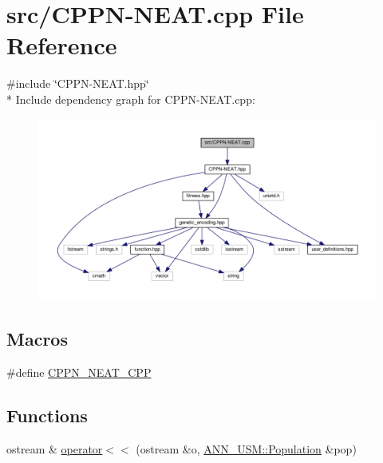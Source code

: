 \hypertarget{_c_p_p_n-_n_e_a_t_8cpp}{\section{src/\-C\-P\-P\-N-\/\-N\-E\-A\-T.cpp File Reference}
\label{_c_p_p_n-_n_e_a_t_8cpp}
}
{\ttfamily \#include \char`\"{}C\-P\-P\-N-\/\-N\-E\-A\-T.\-hpp\char`\"{}}\\*
Include dependency graph for C\-P\-P\-N-\/\-N\-E\-A\-T.cpp\-:
\nopagebreak
\begin{figure}[H]
\begin{center}
\leavevmode
\includegraphics[width=350pt]{_c_p_p_n-_n_e_a_t_8cpp__incl}
\end{center}
\end{figure}
\subsection*{Macros}
\begin{DoxyCompactItemize}
\item 
\#define \hyperlink{_c_p_p_n-_n_e_a_t_8cpp_a9341589bd3db6e2d528925591c40148d}{C\-P\-P\-N\-\_\-\-N\-E\-A\-T\-\_\-\-C\-P\-P}
\end{DoxyCompactItemize}
\subsection*{Functions}
\begin{DoxyCompactItemize}
\item 
ostream \& \hyperlink{_c_p_p_n-_n_e_a_t_8cpp_a81655a8d2a9e6437481493618f945ea4}{operator$<$$<$} (ostream \&o, \hyperlink{class_a_n_n___u_s_m_1_1_population}{A\-N\-N\-\_\-\-U\-S\-M\-::\-Population} \&pop)
\end{DoxyCompactItemize}


